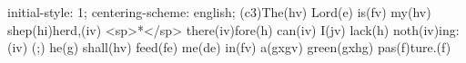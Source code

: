 initial-style: 1;
centering-scheme: english;
(c3)The(hv) Lord(e) is(fv) my(hv) shep(hi)herd,(iv) <sp>*</sp> there(iv)fore(h) can(iv) I(jv) lack(h) noth(iv)ing:(iv) (;) he(g) shall(hv) feed(fe) me(de) in(fv) a(gxgv) green(gxhg) pas(f)ture.(f)
